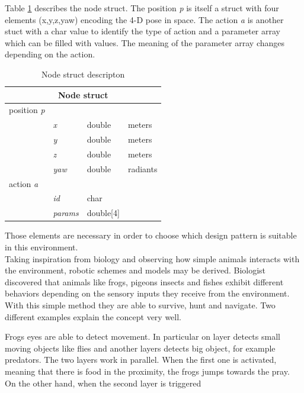  Table \ref{tab:node} describes the node struct. The position \textit{p} is itself a struct with four elements (x,y,z,yaw) encoding the 4-D pose in space. The action \textit{a} is another stuct with a char value to identify the type of action and a parameter array which can be filled with values. The meaning of the parameter array changes depending on the action.
\begin{table}[h]
\centering
\begin{tabular}{llll}
\multicolumn{4}{c}{\textbf{Node} struct} \\
\hline
position \textit{p} &     &       &           \\
           & \textit{x}   & double & meters    \\
           & \textit{y}   & double & meters    \\
           & \textit{z}   & double & meters    \\
           & \textit{yaw} & double & radiants  \\ \hline
action \textit{a}   &     &       &           \\
           & \textit{id}  & char  &           \\
           & \textit{params}    &  double[4]     & \\
\end{tabular}
\label{tab:node}
\caption{Node struct descripton}
\end{table}
Those elements are necessary in order to choose which design pattern is suitable in this environment.
\newline \\
\noindent
Taking inspiration from biology and observing how simple animals interacts with the environment, robotic schemes and models may be derived. Biologist discovered that animals like frogs, pigeons insects and fishes exhibit different behaviors depending on the sensory inputs they receive from the environment. With this simple method they are able to survive, hunt and navigate. Two different examples explain the concept very well.

Frogs eyes are able to detect movement. In particular on layer detects small moving objects like flies and another layers detects big object, for example predators. The two layers work in parallel. When the first one is activated, meaning that there is food in the proximity, the frogs jumps towards the pray. On the other hand, when the second layer is triggered 






